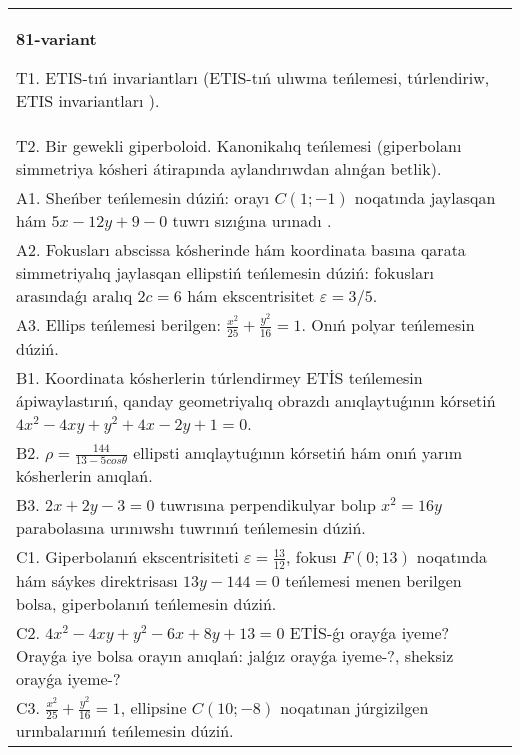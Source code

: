 \documentclass{article}
\begin{document}
\begin{tabular}{m{17cm}}
\textbf{81-variant}
\newline

T1. ETIS-tıń invariantları (ETIS-tıń ulıwma teńlemesi, túrlendiriw, ETIS invariantları ).\\

T2. Bir gewekli giperboloid. Kanonikalıq teńlemesi (giperbolanı simmetriya kósheri átirapında aylandırıwdan alınǵan betlik).\\

A1. Sheńber teńlemesin dúziń: orayı $C (1;-1) $ noqatında jaylasqan hám $5 x-12 y+9 -0$ tuwrı sızıǵına urınadı .\\

A2. Fokusları abscissa kósherinde hám koordinata basına qarata simmetriyalıq jaylasqan ellipstiń teńlemesin dúziń: fokusları arasındaǵı aralıq $2 c=6$ hám ekscentrisitet $\varepsilon=3/5$.\\

A3. Ellips teńlemesi berilgen: $\frac{x^2}{25}+\frac{y^2}{16}=1$. Onıń polyar teńlemesin dúziń.\\

B1. Koordinata kósherlerin túrlendirmey ETİS teńlemesin ápiwaylastırıń, qanday geometriyalıq obrazdı anıqlaytuǵının kórsetiń $4x^{2} - 4xy + y^{2} + 4x - 2y + 1 = 0$.  \\

B2. $\rho = \frac{144}{13 - 5cos\theta}$ ellipsti anıqlaytuǵının kórsetiń hám onıń yarım kósherlerin anıqlań.\\

B3. $2x + 2y - 3 = 0$ tuwrısına perpendikulyar bolıp $x^{2} = 16y$ parabolasına urınıwshı tuwrınıń teńlemesin dúziń.  \\

C1. Giperbolanıń ekscentrisiteti $\varepsilon = \frac{13}{12}$, fokusı $F(0;13)$ noqatında hám sáykes direktrisası $13y - 144 = 0$ teńlemesi menen berilgen bolsa, giperbolanıń teńlemesin dúziń.  \\

C2. $4x^{2} - 4xy + y^{2} - 6x + 8y + 13 = 0$ ETİS-ǵı orayǵa iyeme? Orayǵa iye bolsa orayın anıqlań: jalǵız orayǵa iyeme-?, sheksiz orayǵa iyeme-?  \\

C3. $\frac{x^{2}}{25} + \frac{y^{2}}{16} = 1$, ellipsine $C(10; - 8)$ noqatınan júrgizilgen urınbalarınıń teńlemesin dúziń.  \\

\end{tabular}
\vspace{1cm}
\end{document}
